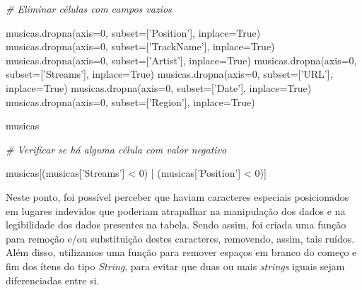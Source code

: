\documentclass[11pt]{article}
\newenvironment{Shaded}{}{}
\newcommand{\DecValTok}[1]{\textcolor[rgb]{0.25,0.63,0.44}{{#1}}}
\newcommand{\StringTok}[1]{\textcolor[rgb]{0.25,0.44,0.63}{{#1}}}
\newcommand{\CommentTok}[1]{\textcolor[rgb]{0.38,0.63,0.69}{\textit{{#1}}}}
\newcommand{\NormalTok}[1]{{#1}}
\newcommand{\VariableTok}[1]{\textcolor[rgb]{0.10,0.09,0.49}{{#1}}}
\newcommand{\OperatorTok}[1]{\textcolor[rgb]{0.40,0.40,0.40}{{#1}}}
\begin{document}
    \begin{Shaded}
\begin{Highlighting}[]
    \CommentTok{# Eliminar células com campos vazios}

\NormalTok{musicas.dropna(axis}\OperatorTok{=}\DecValTok{0}\NormalTok{, subset}\OperatorTok{=}\NormalTok{[}\StringTok{'Position'}\NormalTok{], inplace}\OperatorTok{=}\VariableTok{True}\NormalTok{)}
\NormalTok{musicas.dropna(axis}\OperatorTok{=}\DecValTok{0}\NormalTok{, subset}\OperatorTok{=}\NormalTok{[}\StringTok{'TrackName'}\NormalTok{], inplace}\OperatorTok{=}\VariableTok{True}\NormalTok{)}
\NormalTok{musicas.dropna(axis}\OperatorTok{=}\DecValTok{0}\NormalTok{, subset}\OperatorTok{=}\NormalTok{[}\StringTok{'Artist'}\NormalTok{], inplace}\OperatorTok{=}\VariableTok{True}\NormalTok{)}
\NormalTok{musicas.dropna(axis}\OperatorTok{=}\DecValTok{0}\NormalTok{, subset}\OperatorTok{=}\NormalTok{[}\StringTok{'Streams'}\NormalTok{], inplace}\OperatorTok{=}\VariableTok{True}\NormalTok{)}
\NormalTok{musicas.dropna(axis}\OperatorTok{=}\DecValTok{0}\NormalTok{, subset}\OperatorTok{=}\NormalTok{[}\StringTok{'URL'}\NormalTok{], inplace}\OperatorTok{=}\VariableTok{True}\NormalTok{)}
\NormalTok{musicas.dropna(axis}\OperatorTok{=}\DecValTok{0}\NormalTok{, subset}\OperatorTok{=}\NormalTok{[}\StringTok{'Date'}\NormalTok{], inplace}\OperatorTok{=}\VariableTok{True}\NormalTok{)}
\NormalTok{musicas.dropna(axis}\OperatorTok{=}\DecValTok{0}\NormalTok{, subset}\OperatorTok{=}\NormalTok{[}\StringTok{'Region'}\NormalTok{], inplace}\OperatorTok{=}\VariableTok{True}\NormalTok{)}

\NormalTok{musicas}
\end{Highlighting}
\end{Shaded}

    \begin{Shaded}
\begin{Highlighting}[]
    \CommentTok{# Verificar se há alguma célula com valor negativo}

\NormalTok{musicas[(musicas[}\StringTok{'Streams'}\NormalTok{] }\OperatorTok{<} \DecValTok{0}\NormalTok{) }\OperatorTok{|}\NormalTok{ (musicas[}\StringTok{'Position'}\NormalTok{] }\OperatorTok{<} \DecValTok{0}\NormalTok{)]}
\end{Highlighting}
\end{Shaded}

    Neste ponto, foi possível perceber que haviam caracteres especiais
posicionados em lugares indevidos que poderiam atrapalhar na manipulação
dos dados e na legibilidade dos dados presentes na tabela. Sendo assim,
foi criada uma função para remoção e/ou substituição destes caracteres,
removendo, assim, tais ruídos. Além disso, utilizamos uma função para
remover espaços em branco do começo e fim dos ítens do tipo
\emph{String}, para evitar que duas ou mais \emph{strings} iguais sejam
diferenciadas entre si.
\end{document}
